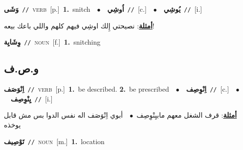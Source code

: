 \documentclass[10pt,a4paper,twoside]{article} %
\begin{document}
\begin{multicols}{2}
{\setlength\topsep{0pt}\textbf{\foreignlanguage{arabic}{وَشَى}}\ {\color{gray}\texttt{//}\color{black}}\ \textsc{verb}\ [p.]\ \textbf{1.}~snitch\ \ $\bullet$\ \ \setlength\topsep{0pt}\textbf{\foreignlanguage{arabic}{اُوشِي}}\ {\color{gray}\texttt{//}\color{black}}\ [c.]\ \ $\bullet$\ \ \setlength\topsep{0pt}\textbf{\foreignlanguage{arabic}{يُوشِي}}\ {\color{gray}\texttt{//}\color{black}}\ [i.]\  \begin{flushright}\color{gray}\foreignlanguage{arabic}{\textbf{\underline{\foreignlanguage{arabic}{أمثلة}}}: نصيحتي إِلك اوشِي فيهم كلهم واللي باعك بيعه!}\end{flushright}\color{black}} \vspace{2mm}

{\setlength\topsep{0pt}\textbf{\foreignlanguage{arabic}{وِشَايِة}}\ {\color{gray}\texttt{//}\color{black}}\ \textsc{noun}\ [f.]\ \textbf{1.}~snitching\ } \vspace{2mm}

\vspace{-3mm}
\subsection*{\color{blue}\foreignlanguage{arabic}{و.ص.ف}\color{blue}{}} 

{\setlength\topsep{0pt}\textbf{\foreignlanguage{arabic}{اِنْوَصَف}}\ {\color{gray}\texttt{//}\color{black}}\ \textsc{verb}\ [p.]\ \textbf{1.}~be described.  \textbf{2.}~be prescribed\ \ $\bullet$\ \ \setlength\topsep{0pt}\textbf{\foreignlanguage{arabic}{اِنْوِصِف}}\ {\color{gray}\texttt{//}\color{black}}\ [c.]\ \ $\bullet$\ \ \setlength\topsep{0pt}\textbf{\foreignlanguage{arabic}{يِنْوِصِف}}\ {\color{gray}\texttt{//}\color{black}}\ [i.]\  \begin{flushright}\color{gray}\foreignlanguage{arabic}{\textbf{\underline{\foreignlanguage{arabic}{أمثلة}}}: قرف الشغل معهم مابيِنْوِصِف\ $\bullet$\ \  أبوي اِنْوَصَف اله نفس الدوا بس مش قابل يوخذه}\end{flushright}\color{black}} \vspace{2mm}

{\setlength\topsep{0pt}\textbf{\foreignlanguage{arabic}{تَوْصِيف}}\ {\color{gray}\texttt{//}\color{black}}\ \textsc{noun}\ [m.]\ \textbf{1.}~location\ } \vspace{2mm}


\end{multicols}
\end{document}
